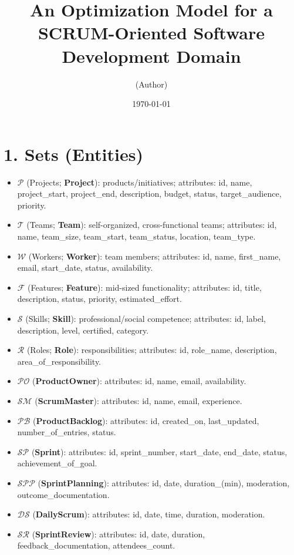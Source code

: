 \documentclass[11pt,a4paper]{article}
\title{An Optimization Model for a SCRUM-Oriented Software Development Domain}
\author{(Author)}
\date{\today}
\begin{document}
\maketitle
\tableofcontents
\newpage

\section{1. Sets (Entities)}
\begin{itemize}
  \item $\mathcal{P}$ (Projects; \textbf{Project}): products/initiatives; attributes: id, name, project\_start, project\_end, description, budget, status, target\_audience, priority.
  \item $\mathcal{T}$ (Teams; \textbf{Team}): self-organized, cross-functional teams; attributes: id, name, team\_size, team\_start, team\_status, location, team\_type.
  \item $\mathcal{W}$ (Workers; \textbf{Worker}): team members; attributes: id, name, first\_name, email, start\_date, status, availability.
  \item $\mathcal{F}$ (Features; \textbf{Feature}): mid-sized functionality; attributes: id, title, description, status, priority, estimated\_effort.
  \item $\mathcal{S}$ (Skills; \textbf{Skill}): professional/social competence; attributes: id, label, description, level, certified, category.
  \item $\mathcal{R}$ (Roles; \textbf{Role}): responsibilities; attributes: id, role\_name, description, area\_of\_responsibility.
  \item $\mathcal{PO}$ (\textbf{ProductOwner}): attributes: id, name, email, availability.
  \item $\mathcal{SM}$ (\textbf{ScrumMaster}): attributes: id, name, email, experience.
  \item $\mathcal{PB}$ (\textbf{ProductBacklog}): attributes: id, created\_on, last\_updated, number\_of\_entries, status.
  \item $\mathcal{SP}$ (\textbf{Sprint}): attributes: id, sprint\_number, start\_date, end\_date, status, achievement\_of\_goal.
  \item $\mathcal{SPP}$ (\textbf{SprintPlanning}): attributes: id, date, duration\_(min), moderation, outcome\_documentation.
  \item $\mathcal{DS}$ (\textbf{DailyScrum}): attributes: id, date, time, duration, moderation.
  \item $\mathcal{SR}$ (\textbf{SprintReview}): attributes: id, date, duration, feedback\_documentation, attendees\_count.

\end{itemize}
\end{document}
